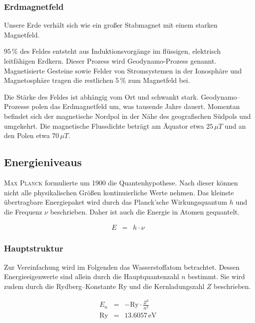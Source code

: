 \documentclass[12pt,a4paper]{scrartcl}
\numberwithin{equation}{section} %
\begin{document}
\subsubsection{Erdmagnetfeld}
\label{Erdmagnetfeld}
Unsere Erde verhält sich wie ein großer Stabmagnet mit einem starken Magnetfeld.

$95\,\%$ des Feldes entsteht aus Induktionsvorgänge im flüssigen, elektrisch leitfähigen Erdkern. Dieser Prozess wird Geodynamo-Prozess genannt. Magnetisierte Gesteine sowie Felder von Stromsystemen in der Ionosphäre und Magnetosphäre tragen die restlichen $5\,\%$ zum Magnetfeld bei.

Die Stärke des Feldes ist abhängig vom Ort und schwankt stark. Geodynamo--Prozesse polen das Erdmagnetfeld um, was tausende Jahre dauert. Momentan befindet sich der magnetische Nordpol in der Nähe des geografischen Südpols und umgekehrt. Die magnetische Flussdichte beträgt am Äquator etwa $25\,\mu T$ und an den Polen etwa $70\,\mu T$. \cite{Geomagnetismus}

\subsection{Energieniveaus}
\label{Energieniveaus}

\textsc{Max Planck} formulierte um 1900 die Quantenhypothese. Nach dieser können nicht alle physikalischen Größen kontinuierliche Werte nehmen. Das kleinste übertragbare Energiepaket wird durch das Planck'sche Wirkungsquantum $h$ und die Frequenz $\nu$ beschrieben. Daher ist auch die Energie in Atomen gequantelt.

\begin{eqnarray}
	E &=& h\cdot \nu \label{eq:Energie Strahlung}
\end{eqnarray}

\subsubsection{Hauptstruktur}
\label{Wasserstoffatom}
Zur Vereinfachung wird im Folgenden das Wasserstoffatom betrachtet. Dessen Energieeigenwerte sind allein durch die Hauptquantenzahl $n$ bestimmt. Sie wird zudem durch die Rydberg--Konstante $\mathrm{Ry}$ und die Kernladungszahl $Z$ beschrieben.

\begin{eqnarray}
	E_n &=& - \mathrm{Ry} \cdot \frac{Z^2}{n^2} \\
	\mathrm{Ry} &=& 13.6057 \mathrm{\,eV}
\end{eqnarray}
\end{document}
